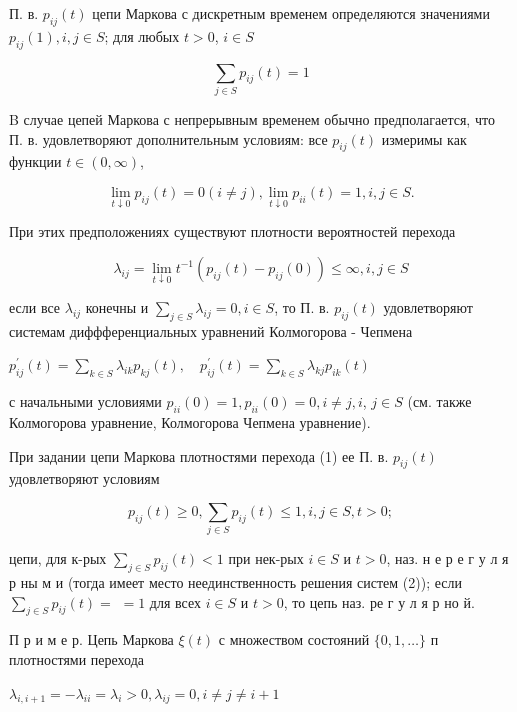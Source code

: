 \documentclass[10pt]{article}
\begin{document}
П. в. $p_{i j}(t)$ цепи Маркова с дискретным временем определяются значениями $p_{i j}(1), i, j \in S$; для любых $t>0$, $i \in S$



\[

\sum_{j \in S} p_{i j}(t)=1

\]



B случае цепей Маркова с непрерывным временем обычно предполагается, что П. в. удовлетворяют дополнительным условиям: все $p_{i j}(t)$ измеримы как функции $t \in(0, \infty)$,



\[

\lim _{t \downarrow 0} p_{i j}(t)=0(i \neq j), \lim _{t \downarrow 0} p_{i i}(t)=1, i, j \in S .

\]



При этих предположениях существуют плотности вероятностей перехода



\[

\lambda_{i j}=\lim _{t \downarrow 0} t^{-1}\left(p_{i j}(t)-p_{i j}(0)\right) \leqslant \infty, i, j \in S

\]



если все $\lambda_{i j}$ конечны и $\sum_{j \in S} \lambda_{i j}=0, i \in S$, то П. в. $p_{i j}(t)$ удовлетворяют системам диффференциальных уравнений Колмогорова - Чепмена



$p_{i j}^{\prime}(t)=\sum_{k \in S} \lambda_{i k} p_{k j}(t), \quad p_{i j}^{\prime}(t)=\sum_{k \in S} \lambda_{k j} p_{i k}(t)$



с начальными условиями $p_{i i}(0)=1, p_{i i}(0)=0, i \neq j, i$, $j \in S$ (см. также Колмогорова уравнение, Колмогорова Чепмена уравнение).



При задании цепи Маркова плотностями перехода (1) ее П. в. $p_{i j}(t)$ удовлетворяют условиям



\[

p_{i j}(t) \geqslant 0, \sum_{j \in S} p_{i j}(t) \leqslant 1, i, j \in S, t>0 ;

\]



цепи, для к-рых $\sum_{j \in S} p_{i j}(t)<1$ при нек-рых $i \in S$ и $t>0$, наз. н е р е г у л я р ны м и (тогда имеет место неединственность решения систем (2)); если $\sum_{j \in S} p_{i j}(t)=$ $=1$ для всех $i \in S$ и $t>0$, то цепь наз. ре г у л я р но й.



П р и м е р. Цепь Маркова $\xi(t)$ с множеством состояний $\{0,1, \ldots\}$ п плотностями перехода



$\lambda_{i, i+1}=-\lambda_{i i}=\lambda_{i}>0, \lambda_{i j}=0, i \neq j \neq i+1$
\end{document}
